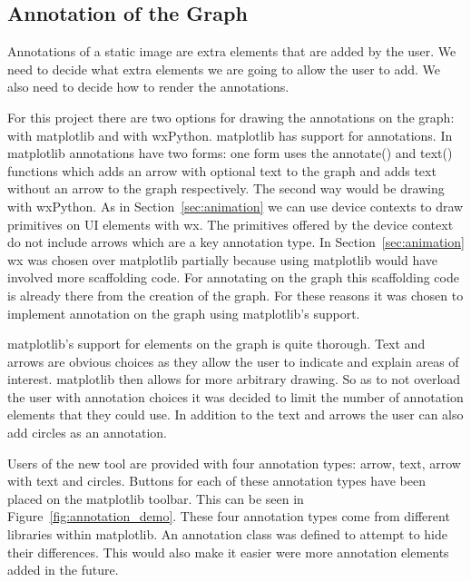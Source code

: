 \subsection{Annotation of the Graph}

Annotations of a static image are extra elements that are added by the user.  We need to decide what extra elements we are going to allow the user to add.  We also need to decide how to render the annotations.

For this project there are two options for drawing the annotations on the graph: with matplotlib and with wxPython.  matplotlib has support for annotations.  In matplotlib annotations have two forms: one form uses the annotate() and text() functions  which adds an arrow with optional text to the graph and adds text without an arrow to the graph respectively.  The second way would be drawing with wxPython.  As in Section~\ref{sec:animation} we can use device contexts to draw primitives on \ac{UI} elements with wx.  The primitives offered by the device context do not include arrows which are a key annotation type.  In Section~\ref{sec:animation} wx was chosen over matplotlib partially because using matplotlib would have involved more scaffolding code.  For annotating on the graph this scaffolding code is already there from the creation of the graph.  For these reasons it was chosen to implement annotation on the graph using matplotlib's support.

matplotlib's support for elements on the graph is quite thorough.  Text and arrows are obvious choices as they allow the user to indicate and explain areas of interest.  matplotlib then allows for more arbitrary drawing.  So as to not overload the user with annotation choices it was decided to limit the number of annotation elements that they could use.  In addition to the text and arrows the user can also add circles as an annotation.

Users of the new tool are provided with four annotation types: arrow, text, arrow with text and circles.  Buttons for each of these annotation types have been placed on the matplotlib toolbar.  This can be seen in Figure~\ref{fig:annotation_demo}.  These four annotation types come from different libraries within matplotlib.  An annotation class was defined to attempt to hide their differences.  This would also make it easier were more annotation elements added in the future.

